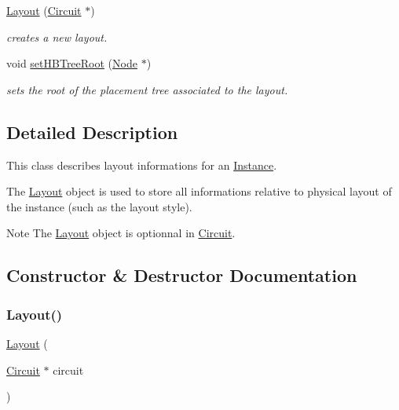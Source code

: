 \begin{DoxyCompactItemize}
\hyperlink{class_open_chams_1_1_layout_a789d82a4c563002befc83d538431d474}{Layout} (\hyperlink{class_open_chams_1_1_circuit}{Circuit} $\ast$)
\begin{DoxyCompactList}\small\item\em creates a new layout. \end{DoxyCompactList}\item 
void \hyperlink{class_open_chams_1_1_layout_a6d828958e0faf1346b27276eab101858}{set\+H\+B\+Tree\+Root} (\hyperlink{class_open_chams_1_1_node}{Node} $\ast$)
\begin{DoxyCompactList}\small\item\em sets the root of the placement tree associated to the layout. \end{DoxyCompactList}\end{DoxyCompactItemize}


\subsection{Detailed Description}
This class describes layout informations for an \hyperlink{class_open_chams_1_1_instance}{Instance}.

The \hyperlink{class_open_chams_1_1_layout}{Layout} object is used to store all informations relative to physical layout of the instance (such as the layout style).

\begin{DoxyNote}{Note}
The \hyperlink{class_open_chams_1_1_layout}{Layout} object is optionnal in \hyperlink{class_open_chams_1_1_circuit}{Circuit}. 
\end{DoxyNote}


\subsection{Constructor \& Destructor Documentation}
\mbox{\label{class_open_chams_1_1_layout_a789d82a4c563002befc83d538431d474}} 
\subsubsection{\texorpdfstring{Layout()}{Layout()}}
{\footnotesize\ttfamily \hyperlink{class_open_chams_1_1_layout}{Layout} (\begin{DoxyParamCaption}\item[{\hyperlink{class_open_chams_1_1_circuit}{Circuit} $\ast$}]{circuit }\end{DoxyParamCaption})}



